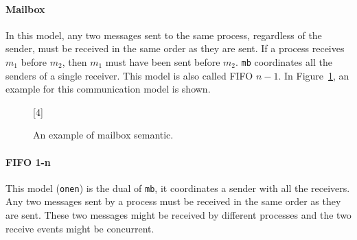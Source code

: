 

\paragraph{Mailbox}
In this model, any two messages sent to the same process, regardless of the sender, 
must be received in the same order as they are sent. If a process receives $m_1$ 
before $m_2$, then $m_1$ must have been sent before $m_2$. \verb|mb| coordinates all 
the senders of a single receiver. This model is also called FIFO $n-1$.
In Figure~\ref{fig:mailbox}, an example for this communication model is shown.

\begin{figure}[!ht]
	\centering
	\begin{msc}[draw frame=none, draw head=none, msc keyword=, 
				head height=0px, label distance=0.5ex, 
				foot height=0px, foot distance=0px]{}

		[4]
		\nextlevel
		\nextlevel
		\nextlevel
	\end{msc}
	\caption{An example of mailbox semantic.}
	\label{fig:mailbox}
\end{figure}



\paragraph{FIFO 1-n}
This model (\verb|onen|) is the dual of \verb|mb|, it coordinates a sender with all the 
receivers. Any two messages sent by a process must be received in the same 
order as they are sent. These two messages might be received by different 
processes and the two receive events might be concurrent.

